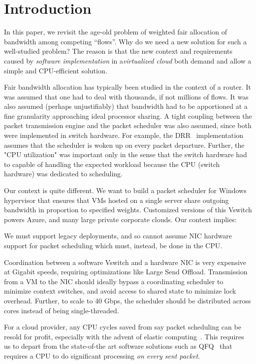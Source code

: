 \section {Introduction}

In this paper, we revisit the age-old problem of weighted fair
allocation of bandwidth among competing ``flows''. Why do we need a new solution
for such a well-studied problem? The reason is that the new context and
requirements caused by {\em software implementation} in a{\em virtualized cloud}
both demand and allow a simple and CPU-efficient solution. 

Fair bandwidth allocation has typically been studied in the context of a router.
It was assumed that one had to deal with thousands, if not
millions of flows. It was also assumed (perhaps unjustifiably) that
bandwidth had to be apportioned at a fine granularity approaching ideal
processor sharing. A tight coupling between the packet transmission engine and
the packet scheduler was also assumed, since both were implemented in switch
hardware.  For example, the DRR~\cite{drr} implementation assumes that the
scheduler is woken up on every packet departure. Further, the "CPU utilization"
was important only in the sense that the switch hardware had to capable of
handling the expected workload because the CPU (switch hardware) was dedicated
to scheduling.

Our context is quite different. We want to build a packet scheduler for Windows
hypervisor that ensures that VMs hosted on a single server share outgoing
bandwidth in proportion to specified weights. Customized versions of this
Vswitch powers Azure, and many large private corporate clouds. Our context
implies:

 We must support legacy deployments, and so cannot assume NIC hardware support for
packet scheduling which must, instead, be done in the CPU.

 Coordination between a
software Vswitch and a hardware NIC is very expensive at Gigabit speeds, requiring optimizations
like Large Send Offload.  Transmission from a VM to the NIC
should ideally bypass a coordinating scheduler to
minimize context switches, and avoid access to shared state to minimize lock
overhead.  Further, to scale to 40 Gbps, the scheduler should be distributed
across cores instead of being single-threaded. 

 For a cloud provider, any CPU cycles saved from
say packet scheduling can be resold for profit, especially with the advent of
elastic computing~\cite{aws}.  This requires us to depart from the state-of-the
art software solutions such as QFQ~\cite{qfq} that requires a CPU to do
significant processing {\em on every sent packet}.

